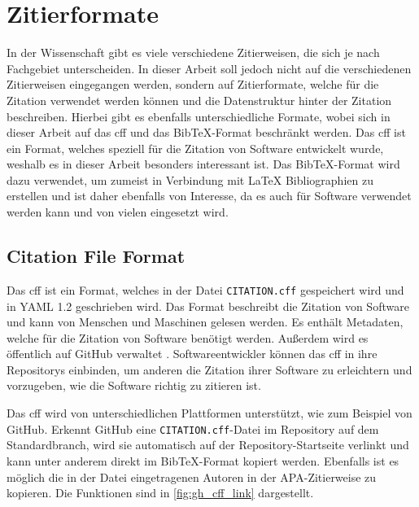 \section{Zitierformate}
\label{sec:zitierformate}
In der Wissenschaft gibt es viele verschiedene Zitierweisen, die sich je nach Fachgebiet unterscheiden.
In dieser Arbeit soll jedoch nicht auf die verschiedenen Zitierweisen eingegangen werden, sondern auf Zitierformate, welche für die Zitation verwendet werden können und die Datenstruktur hinter der Zitation beschreiben.
Hierbei gibt es ebenfalls unterschiedliche Formate, wobei sich in dieser Arbeit auf das \gls{cff} und das Bib\TeX{}-Format beschränkt werden.
Das \gls{cff} ist ein Format, welches speziell für die Zitation von Software entwickelt wurde, weshalb es in dieser Arbeit besonders interessant ist.
Das Bib\TeX{}-Format wird dazu verwendet, um zumeist in Verbindung mit \LaTeX{} Bibliographien zu erstellen und ist daher ebenfalls von Interesse, da es auch für Software verwendet werden kann und von vielen eingesetzt wird.

\subsection{Citation File Format}
\label{subsec:citation-file-format}
Das \gls{cff} ist ein Format, welches in der Datei \texttt{CITATION.cff} gespeichert wird und in YAML 1.2 geschrieben wird. 
Das Format beschreibt die Zitation von Software und kann von Menschen und Maschinen gelesen werden.
Es enthält Metadaten, welche für die Zitation von Software benötigt werden.
Außerdem wird es öffentlich auf GitHub verwaltet \autocite{druskat_citation_2021}.
Softwareentwickler können das \gls{cff} in ihre Repositorys einbinden, um anderen die Zitation ihrer Software zu erleichtern und vorzugeben, wie die Software richtig zu zitieren ist.

Das \gls{cff} wird von unterschiedlichen Plattformen unterstützt, wie zum Beispiel von GitHub.
Erkennt GitHub eine \texttt{CITATION.cff}-Datei im Repository auf dem Standardbranch, wird sie automatisch auf der Repository-Startseite verlinkt und kann unter anderem direkt im Bib\TeX{}-Format kopiert werden.
Ebenfalls ist es möglich die in der Datei eingetragenen Autoren in der APA-Zitierweise zu kopieren.
Die Funktionen sind in \autoref{fig:gh_cff_link} dargestellt.

